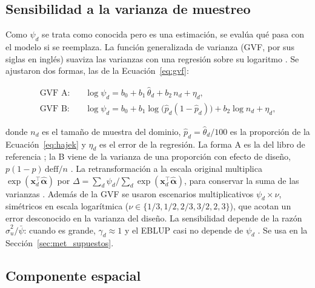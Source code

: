 \subsection{Sensibilidad a la varianza de muestreo}
\label{subsec:gvf}

Como $\psi_d$ se trata como conocida pero es una estimación, se evalúa qué pasa con el modelo si se reemplaza. La función generalizada de varianza (GVF, por sus siglas en inglés) suaviza las varianzas con una regresión sobre su logaritmo \cite[p.~427]{morales2021smallarea}. Se ajustaron dos formas, las de la Ecuación~\ref{eq:gvf}:

\begin{equation}
\begin{aligned}
    \text{GVF A:}\quad & \log \psi_d = b_0 + b_1\, \hat{\theta}_d + b_2\, n_d + \eta_d, \\
    \text{GVF B:}\quad & \log \psi_d = b_0 + b_1 \log\!\big(\hat{p}_d(1-\hat{p}_d)\big) + b_2 \log n_d + \eta_d,
\end{aligned}
\label{eq:gvf}
\end{equation}

donde $n_d$ es el tamaño de muestra del dominio, $\hat{p}_d = \hat{\theta}_d/100$ es la proporción de la Ecuación~\ref{eq:hajek} y $\eta_d$ es el error de la regresión. La forma A es la del libro de referencia \cite[p.~427]{morales2021smallarea}; la B viene de la varianza de una proporción con efecto de diseño, $p(1-p)\,\text{deff}/n$ \cite[p.~15]{Tellez2020}. La retransformación a la escala original multiplica $\exp(\mathbf{x}_d^\top\hat{\boldsymbol{\alpha}})$ por $\Delta = \sum_d \psi_d / \sum_d \exp(\mathbf{x}_d^\top\hat{\boldsymbol{\alpha}})$, para conservar la suma de las varianzas \cite[pp.~15--16]{MarinTralmaGuerrero2024}. Además de la GVF se usaron escenarios multiplicativos $\psi_d \times \nu$, simétricos en escala logarítmica ($\nu \in \{1/3, 1/2, 2/3, 3/2, 2, 3\}$), que acotan un error desconocido en la varianza del diseño. La sensibilidad depende de la razón $\hat{\sigma}_u^2 / \bar{\psi}$: cuando es grande, $\gamma_d \approx 1$ y el EBLUP casi no depende de $\psi_d$ \cite[p.~143]{Benedetti2024}. Se usa en la Sección~\ref{sec:met_supuestos}.

\subsection{Componente espacial}
\label{subsec:espacial}


